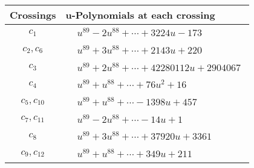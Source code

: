 \documentclass[1p]{elsarticle_modified}
\theoremstyle{definition}
\begin{document}
\begin{tabular}{m{50pt}|m{274pt}}
Crossings & \hspace{64pt}u-Polynomials at each crossing \\
\hline $$\begin{aligned}c_{1}\end{aligned}$$&$\begin{aligned}
&u^{89}-2 u^{88}+\cdots+3224 u-173
\end{aligned}$\\
\hline $$\begin{aligned}c_{2},c_{6}\end{aligned}$$&$\begin{aligned}
&u^{89}+3 u^{88}+\cdots+2143 u+220
\end{aligned}$\\
\hline $$\begin{aligned}c_{3}\end{aligned}$$&$\begin{aligned}
&u^{89}+2 u^{88}+\cdots+42280112 u+2904067
\end{aligned}$\\
\hline $$\begin{aligned}c_{4}\end{aligned}$$&$\begin{aligned}
&u^{89}+u^{88}+\cdots+76 u^2+16
\end{aligned}$\\
\hline $$\begin{aligned}c_{5},c_{10}\end{aligned}$$&$\begin{aligned}
&u^{89}+u^{88}+\cdots-1398 u+457
\end{aligned}$\\
\hline $$\begin{aligned}c_{7},c_{11}\end{aligned}$$&$\begin{aligned}
&u^{89}-2 u^{88}+\cdots-14 u+1
\end{aligned}$\\
\hline $$\begin{aligned}c_{8}\end{aligned}$$&$\begin{aligned}
&u^{89}+3 u^{88}+\cdots+37920 u+3361
\end{aligned}$\\
\hline $$\begin{aligned}c_{9},c_{12}\end{aligned}$$&$\begin{aligned}
&u^{89}+u^{88}+\cdots+349 u+211
\end{aligned}$\\
\hline
\end{tabular}\\~\\
\end{document}
